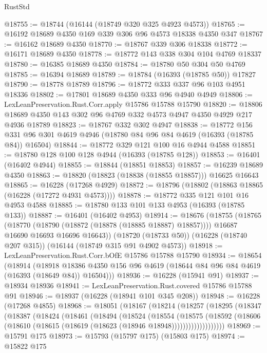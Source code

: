 \begin{lexlean}{RustStd}
\begin{coremodule}
@18755 := @18744 (@16144 (@18749 @320 @325 @4923 @4573))
@18765 := @16192 @18689 @4350 @169 @339 @306 @96 @4573 @18338 @4350 @347
@18767 := @16162 @18689 @4350
@18770 := @18767 @339 @306 @18338
@18772 := @16171 @18689 @4350
@18778 := @18772 @143 @338 @304 @104 @4769 @18337
@18780 := @16385 @18689 @4350
@18784 := @18780 @50 @304 @50 @4769
@18785 := @16394 @18689
@18789 := @18784 (@16393 (@18785 @50)) @17827
@18790 := @18778 @18789
@18796 := @18772 @333 @337 @96 @103 @4951 @18336
@18802 := @17801 @18689 @4350 @333 @96 @4940 @4949
@18806 := LexLeanPreservation.Rust.Corr.apply @15786 @15788 @15790
@18820 := @18806 @18689 @4350 @143 @302 @96 @4769 @332 @4573 @4947 @4350 @4929 @217 @4936 @18789
@18823 := @18767 @332 @302 @4947
@18838 := @18772
    @156
    @331
    @96
    @301
    @4619
    @4946
    (@18780 @84 @96 @84 @4619 (@16393 (@18785 @84)) @16504)
@18844 := @18772 @329 @121 @100 @16 @4944 @4588
@18851 := @18780 @128 @100 @128 @4944 (@16393 (@18785 @128))
@18853 := @16401 (@16402 @4944)
@18855 := @18844 (@18851 @18853)
@18857 := @16239 @18689 @4350
@18863 := @18820 (@18823 (@18838 (@18855 @18857))) @16625 @16643
@18865 := @16228 (@17268 @4929)
@18872 := @18796 (@18802 (@18863 @18865 (@16228 (@17272 @4931 @4573))))
@18878 := @18772 @335 @121 @101 @16 @4953 @4588
@18885 := @18780 @133 @101 @133 @4953 (@16393 (@18785 @133))
@18887 := @16401 (@16402 @4953)
@18914 := @18676
    (@18755
      (@18765
        (@18770 (@18790 (@18872 (@18878 (@18885 @18887) @18857))))
        @16687
        @16690
        @16693
        @16696
        @16643))
    (@18720 (@18733 @50))
    (@16228 (@18740 @207 @315))
    (@16144 (@18749 @315 @91 @4902 @4573))
@18918 := LexLeanPreservation.Rust.Corr.bOfE @15786 @15788 @15790
@18934 := @18654
    (@18914
      (@18918 @18386 @4350 @156 @96 @4619 (@18644 @84 @96 @84 @4619 (@16393 (@18649 @84)) @16504)))
@18936 := @16228 (@15941 @91)
@18937 := @18934 @18936
@18941 := LexLeanPreservation.Rust.covered @15786 @15788 @91
@18946 := @18937 (@16228 (@18941 @101 @345 @208))
@18948 := @16228 (@17268 @4855)
@18968 := @18051
    (@18167
      (@18214
        (@18257
          (@18295
            (@18347
              (@18387
                (@18424
                  (@18461
                    (@18494
                      (@18524
                        (@18554
                          (@18575
                            (@18592
                              (@18606
                                (@18610 (@18615 (@18619 (@18623 (@18946 @18948)))))))))))))))))))
@18969 := @15791 @175
@18973 := @15793 (@15797 @175) (@15803 @175)
@18974 := @15822 @175

\end{coremodule}
\end{lexlean}
